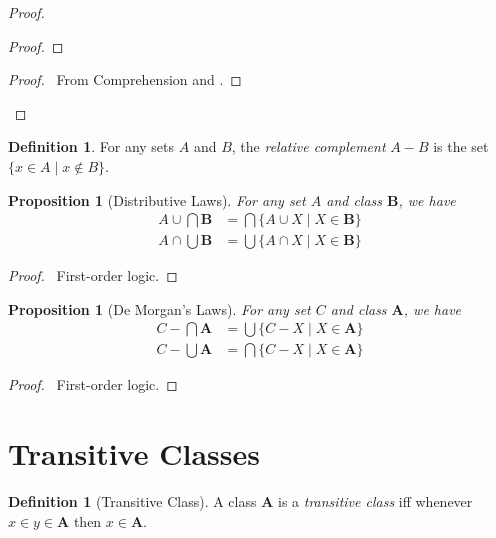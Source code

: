 \documentclass{book}
\let\qed\relax
\newtheorem{prop}[ax]{Proposition}
\theoremstyle{definition}
\newtheorem{df}[ax]{Definition}
\begin{document}
\begin{proof}
\pf
{}
\begin{proof}
\end{proof}
\begin{proof}
	\pf\ From Comprehension and .
\end{proof}
\qed
\end{proof}

\begin{df}
For any sets $A$ and $B$, the \emph{relative complement} $A-B$ is the set $\{x \in A \mid x \notin B\}$.
\end{df}

\begin{prop}[Distributive Laws]
For any set $A$ and class $\mathbf{B}$, we have
\begin{align*}
A \cup \bigcap \mathbf{B} & = \bigcap \{ A \cup X \mid X \in \mathbf{B} \} \\
A \cap \bigcup \mathbf{B} & = \bigcup \{ A \cap X \mid X \in \mathbf{B} \}
\end{align*}
\end{prop}

\begin{proof}
\pf\ First-order logic. \qed
\end{proof}

\begin{prop}[De Morgan's Laws]
For any set $C$ and class $\mathbf{A}$, we have
\begin{align*}
C - \bigcap \mathbf{A} & = \bigcup \{ C - X \mid X \in \mathbf{A} \} \\
C - \bigcup \mathbf{A} & = \bigcap \{ C - X \mid X \in \mathbf{A} \}
\end{align*}
\end{prop}

\begin{proof}
\pf\ First-order logic. \qed
\end{proof}

\section{Transitive Classes}

\begin{df}[Transitive Class]
A class $\mathbf{A}$ is a \emph{transitive class} iff whenever $x \in y \in \mathbf{A}$ then $x \in \mathbf{A}$.
\end{df}
\end{document}
